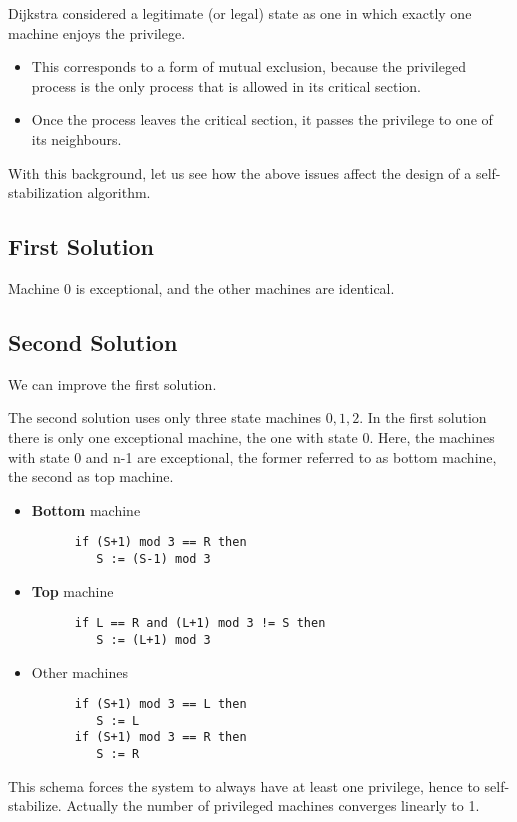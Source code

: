 Dijkstra considered a legitimate (or legal) state as one in which exactly one machine enjoys the privilege.
\begin{itemize}
	\item This corresponds to a form of mutual exclusion, because the privileged process is the only process that is
allowed in its critical section.
	\item Once the process leaves the critical section, it passes the privilege to one of its neighbours.
\end{itemize}
With this background, let us see how the above issues affect the design of a self-
stabilization algorithm.


\subsection{First Solution}

Machine 0 is exceptional, and the other machines are identical.

\subsection{Second Solution}
We can improve the first solution.

The second solution uses only three state machines ${0,1,2}$.
In the first solution there is only one exceptional machine, the one with state 0.
Here, the machines with state 0 and n-1 are exceptional, the former referred to as bottom machine, the second as top machine.

\begin{itemize}
   \item \textbf{Bottom} machine
   \begin{lstlisting}
      if (S+1) mod 3 == R then
         S := (S-1) mod 3 
   \end{lstlisting}
   \item \textbf{Top} machine
   \begin{lstlisting}
      if L == R and (L+1) mod 3 != S then
         S := (L+1) mod 3 
   \end{lstlisting}
   \item Other machines
   \begin{lstlisting}
      if (S+1) mod 3 == L then
         S := L
      if (S+1) mod 3 == R then
         S := R
   \end{lstlisting}
\end{itemize}

This schema forces the system to always have at least one privilege, hence to self-stabilize.
Actually the number of privileged machines converges linearly to 1.


